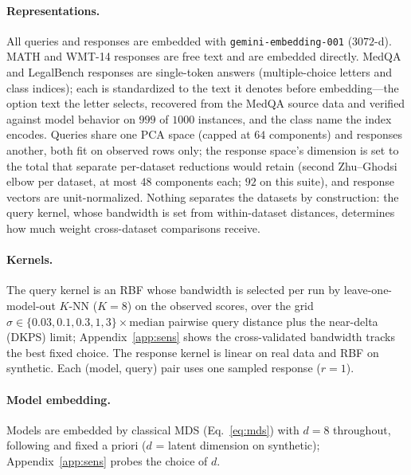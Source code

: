 \documentclass{article}
\theoremstyle{definition}
\theoremstyle{plain}
\begin{document}
\paragraph{Representations.} All queries and responses are embedded with
\texttt{gemini-embedding-001} ($3072$-d). MATH and WMT-14 responses are free text and
are embedded directly. MedQA and LegalBench responses are single-token answers
(multiple-choice letters and class indices); each is standardized to the text it
denotes before embedding---the option text the letter selects, recovered from the
MedQA source data and verified against model behavior on $999$ of $1000$ instances,
and the class name the index encodes. Queries share one PCA space (capped at $64$
components) and responses another, both fit on observed rows only; the response
space's dimension is set to the total that separate per-dataset reductions would
retain (second Zhu--Ghodsi elbow  per dataset, at most $48$ components each; $92$ on
this suite), and response vectors are unit-normalized. Nothing separates the datasets
by construction: the query kernel, whose bandwidth is set from within-dataset
distances, determines how much weight cross-dataset comparisons receive.

\paragraph{Kernels.} The query kernel is an RBF whose bandwidth is selected per run by
leave-one-model-out $K$-NN ($K{=}8$) on the observed scores, over the grid
$\sigma\in\{0.03,0.1,0.3,1,3\}\times\mathrm{median}$ pairwise query distance plus the
near-delta (DKPS) limit; Appendix~\ref{app:sens} shows the cross-validated bandwidth
tracks the best fixed choice. The response kernel is linear on real data and RBF on
synthetic. Each (model, query) pair uses one sampled response ($r{=}1$).

\paragraph{Model embedding.} Models are embedded by classical MDS
(Eq.~\eqref{eq:mds}) with $d{=}8$ throughout, following \citet{dkps_qeff} and fixed a
priori ($d$ = latent dimension on synthetic); Appendix~\ref{app:sens} probes the
choice of $d$.
\end{document}

